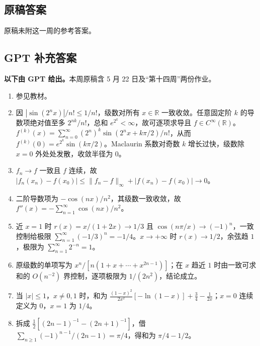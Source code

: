 \documentclass[UTF8,11pt, a4paper, oneside, fontset=none]{ctexbook}
\begin{document}
\clearpage

\subsection*{原稿答案}

\noindent 原稿未附这一周的参考答案。

\clearpage

\subsection*{GPT 补充答案}

\noindent\textbf{以下由 GPT 给出。}本周原稿含 5 月 22 日及“第十四周”两份作业。
\begin{enumerate}
\item 参见教材。
\item 因 $|\sin(2^nx)|/n!\le1/n!$，级数对所有 $x\in\mathbb R$ 一致收敛。任意固定阶 $k$ 的导数项绝对值至多 $2^{nk}/n!$，总和 $e^{2^k}<\infty$，故可逐项求导且 $f\in C^\infty(\mathbb R)$。$f^{(k)}(x)=\sum_{n=0}^\infty(2^n)^k\sin(2^nx+k\pi/2)/n!$，从而 $f^{(k)}(0)=e^{2^k}\sin(k\pi/2)$。Maclaurin 系数对奇数 $k$ 增长过快，级数除 $x=0$ 外处处发散，收敛半径为 $0$。
\item $f_n\to f$ 一致且 $f$ 连续，故 $|f_n(x_n)-f(x_0)|\le\lVert{}f_n-f\rVert_\infty+|f(x_n)-f(x_0)|\to0$。
\item 二阶导数项为 $-\cos(nx)/n^2$，其级数一致收敛，故 $f''(x)=-\sum_{n=1}^\infty\cos(nx)/n^2$。
\item 近 $x=1$ 时 $r(x)=x/(1+2x)\to1/3$ 且 $\cos(n\pi/x)\to(-1)^n$，一致控制给极限 $\sum_{n=1}^\infty(-1/3)^n=-1/4$。$x\to+\infty$ 时 $r(x)\to1/2$，余弦趋 $1$，极限为 $\sum_{n=1}^\infty2^{-n}=1$。
\item 原级数的单项写为 $x^n/[n(1+x+\cdots+x^{2n-1})]$；在 $x$ 趋近 $1$ 时由一致可求和的 $O(n^{-2})$ 界控制，逐项极限为 $1/(2n^2)$，结论成立。
\item 当 $|x|\le1$，$x\ne0,1$ 时，和为 $\frac{(1-x)^2}{2x^2}[-\ln(1-x)]+\frac34-\frac1{2x}$；$x=0$ 连续定义为 $0$，$x=1$ 为 $1/4$。
\item 拆成 $\frac12[(2n-1)^{-1}-(2n+1)^{-1}]$，借 $\sum_{n\ge1}(-1)^{n-1}/(2n-1)=\pi/4$，得和为 $\pi/4-1/2$。
\end{enumerate}
\end{document}
